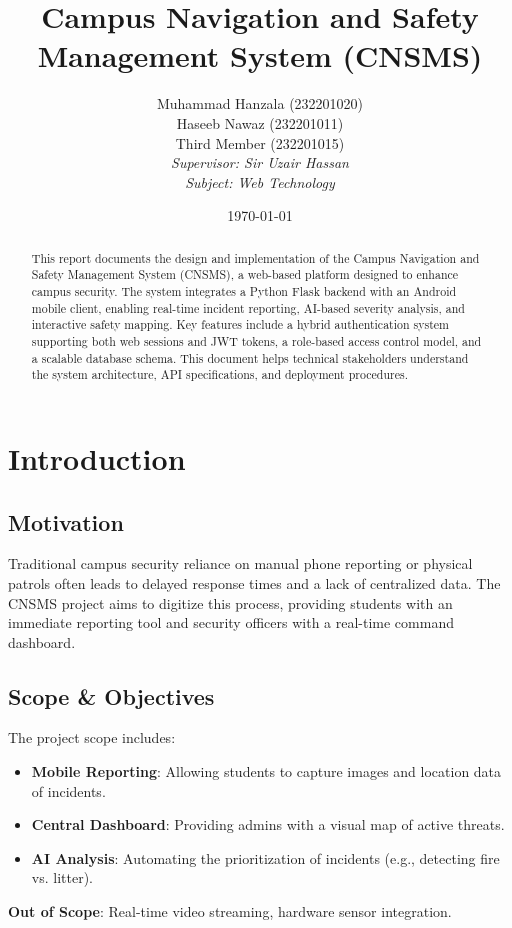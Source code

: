 \documentclass[12pt,a4paper]{article}
\title{\textbf{Campus Navigation and Safety Management System (CNSMS)}}
\author{
    Muhammad Hanzala (232201020) \\
    Haseeb Nawaz (232201011) \\
    Third Member (232201015) \\[1em]
    \textit{Supervisor: Sir Uzair Hassan} \\
    \textit{Subject: Web Technology}
}
\date{\today}
\begin{document}
\maketitle
\begin{abstract}
    This report documents the design and implementation of the Campus Navigation and Safety Management System (CNSMS), a web-based platform designed to enhance campus security. The system integrates a Python Flask backend with an Android mobile client, enabling real-time incident reporting, AI-based severity analysis, and interactive safety mapping. Key features include a hybrid authentication system supporting both web sessions and JWT tokens, a role-based access control model, and a scalable database schema. This document helps technical stakeholders understand the system architecture, API specifications, and deployment procedures.
\end{abstract}

\tableofcontents
\newpage

\section{Introduction}
\subsection{Motivation}
Traditional campus security reliance on manual phone reporting or physical patrols often leads to delayed response times and a lack of centralized data. The CNSMS project aims to digitize this process, providing students with an immediate reporting tool and security officers with a real-time command dashboard.

\subsection{Scope & Objectives}
The project scope includes:
\begin{itemize}
    \item \textbf{Mobile Reporting}: Allowing students to capture images and location data of incidents.
    \item \textbf{Central Dashboard}: Providing admins with a visual map of active threats.
    \item \textbf{AI Analysis}: Automating the prioritization of incidents (e.g., detecting fire vs. litter).
\end{itemize}
\textbf{Out of Scope}: Real-time video streaming, hardware sensor integration.
\end{document}
